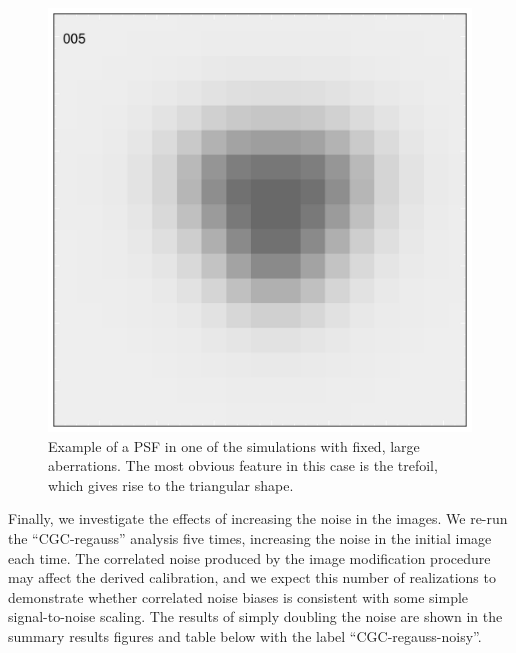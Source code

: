 \documentclass[iop]{emulateapj}
\begin{document}
\begin{figure}
\begin{center}
\includegraphics[width=0.8\columnwidth]{../Plots/rgc_fixedaber_psf_005.pdf}
\end{center}
\caption{Example of a PSF in one of the simulations with fixed, large aberrations.  The most obvious
feature in this case is the trefoil, which gives rise to the triangular shape. \label{fig:trefoil}}
\end{figure}

Finally, we investigate the effects of increasing the noise in the
images. We re-run the ``CGC-regauss'' analysis five times, increasing
the noise in the initial image each time. The correlated noise
produced by the image modification procedure may affect the derived
calibration, and we expect this number of realizations to demonstrate
whether correlated noise biases is consistent with some simple
signal-to-noise scaling. The results of simply doubling the noise are
shown in the summary results figures and table below with the label
``CGC-regauss-noisy''.
\end{document}
